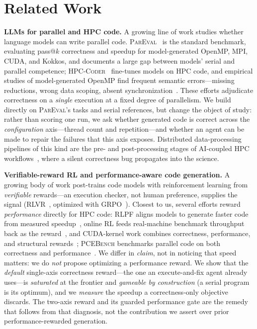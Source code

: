 \section{Related Work}
\label{sec:related}

\vspace{4pt}
\noindent\textbf{LLMs for parallel and HPC code.}
A growing line of work studies whether language models can write parallel code.
\textsc{ParEval}~\cite{pareval} is the standard benchmark, evaluating
pass@$k$ correctness and speedup for model-generated OpenMP, MPI, CUDA, and
Kokkos, and documents a large gap between models' serial and parallel
competence; \textsc{HPC-Coder}~\cite{hpccoder} fine-tunes models on HPC code, and
empirical studies of model-generated OpenMP find frequent semantic
errors---missing reductions, wrong data scoping, absent
synchronization~\cite{openmpunderstand}. These efforts adjudicate correctness on a
\emph{single} execution at a fixed degree of parallelism. We build directly on
\textsc{ParEval}'s tasks and serial references, but change the object of study:
rather than scoring one run, we ask whether generated code is correct across the
\emph{configuration} axis---thread count and repetition---and whether an agent can
be made to repair the failures that this axis exposes. Distributed
data-processing pipelines of this kind are the pre- and post-processing stages of
AI-coupled HPC workflows~\cite{aicoupled}, where a silent correctness bug
propagates into the science.

\vspace{4pt}
\noindent\textbf{Verifiable-reward RL and performance-aware code generation.}
A growing body of work post-trains code models with reinforcement learning from
\emph{verifiable} rewards---an execution checker, not human preference, supplies the
signal (RLVR~\cite{rlvr}, optimized with GRPO~\cite{grpo}). Closest to us, several efforts
reward \emph{performance} directly for HPC code: \textsc{RLPF} aligns models to generate
faster code from measured speedup~\cite{rlpf}, online RL feeds real-machine benchmark
throughput back as the reward~\cite{rlhpc_realmachine}, and CUDA-kernel work combines
correctness, performance, and structural rewards~\cite{cudaperf}; \textsc{PCEBench}
benchmarks parallel code on both correctness and performance~\cite{pcebench}. We differ in
\emph{claim}, not in noticing that speed matters: we do \emph{not} propose optimizing a
performance reward. We show that the \emph{default} single-axis correctness reward---the
one an execute-and-fix agent already uses---is \emph{saturated} at the frontier and
\emph{gameable by construction} (a serial program is its optimum), and we \emph{measure}
the speedup a correctness-only objective discards. The two-axis reward and its guarded
performance gate are the remedy that follows from that diagnosis, not the contribution we
assert over prior performance-rewarded generation.

